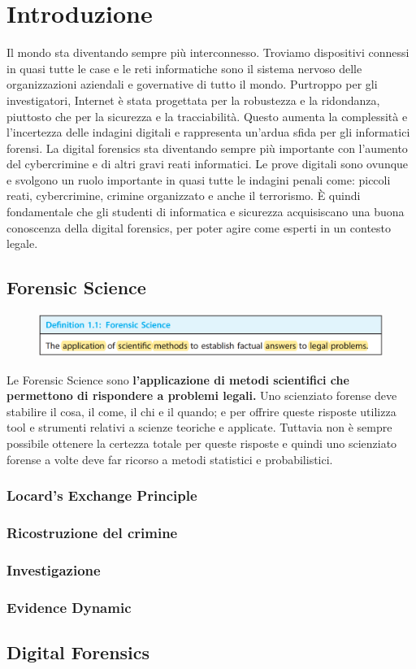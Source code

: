 \chapter{Introduzione}
Il mondo sta diventando sempre più interconnesso. Troviamo dispositivi connessi in quasi tutte le case e le reti informatiche sono il sistema nervoso delle organizzazioni aziendali e governative di tutto il mondo. Purtroppo per gli investigatori, Internet è stata progettata per la robustezza e la ridondanza, piuttosto che per la sicurezza e la tracciabilità. Questo aumenta la complessità e l'incertezza delle indagini digitali e rappresenta un'ardua sfida per gli informatici forensi. La digital forensics sta diventando sempre più importante con l'aumento del cybercrimine e di altri gravi reati informatici. Le prove digitali sono ovunque e svolgono un ruolo importante in quasi tutte le indagini penali come: piccoli reati, cybercrimine, crimine organizzato e anche il terrorismo. È quindi fondamentale che gli studenti di informatica e sicurezza acquisiscano una buona conoscenza della digital forensics, per poter agire come esperti in un contesto legale.

\section{Forensic Science}
\begin{figure}[h]
    \includegraphics[width=\textwidth]{Capitolo 1/Figure/forensic-science-def.png}
\end{figure}

Le Forensic Science sono \textbf{l'applicazione di metodi scientifici che permettono di rispondere a problemi legali.}
Uno scienziato forense deve stabilire il cosa, il come, il chi e il quando; e per offrire queste risposte utilizza tool e strumenti relativi a scienze teoriche e applicate. Tuttavia non è sempre possibile ottenere la certezza totale per queste risposte e quindi uno scienziato forense a volte deve far ricorso a metodi statistici e probabilistici.

\subsection{Locard’s Exchange Principle}

\subsection{Ricostruzione del crimine}

\subsection{Investigazione}

\subsection{Evidence Dynamic}

\section{Digital Forensics}


    





